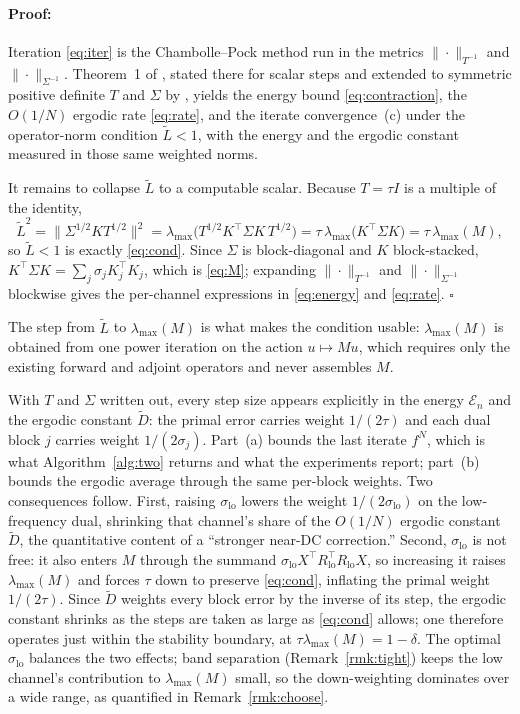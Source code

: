 \documentclass{article}
\newenvironment{proof}{\paragraph{Proof:}}{\hfill$\square$}
\begin{document}
\begin{proof}
Iteration \eqref{eq:iter} is the Chambolle--Pock method run in the metrics $\|\cdot\|_{T^{-1}}$ and $\|\cdot\|_{\Sigma^{-1}}$. Theorem~1 of \citet{chambolle2011first}, stated there for scalar steps and extended to symmetric positive definite $T$ and $\Sigma$ by \citet[\S3]{pock2011diagonal}, yields the energy bound \eqref{eq:contraction}, the $O(1/N)$ ergodic rate \eqref{eq:rate}, and the iterate convergence~(c) under the operator-norm condition $\widetilde L<1$, with the energy and the ergodic constant measured in those same weighted norms.

It remains to collapse $\widetilde L$ to a computable scalar. Because $T=\tau I$ is a multiple of the identity,
\[
\widetilde L^2
=\big\|\Sigma^{1/2}KT^{1/2}\big\|^2
=\lambda_{\max}\!\big(T^{1/2}K^\top\Sigma K\,T^{1/2}\big)
=\tau\,\lambda_{\max}\!\big(K^\top\Sigma K\big)
=\tau\,\lambda_{\max}(M),
\]
so $\widetilde L<1$ is exactly \eqref{eq:cond}. Since $\Sigma$ is block-diagonal and $K$ block-stacked, $K^\top\Sigma K=\sum_j\sigma_jK_j^\top K_j$, which is \eqref{eq:M}; expanding $\|\cdot\|_{T^{-1}}$ and $\|\cdot\|_{\Sigma^{-1}}$ blockwise gives the per-channel expressions in \eqref{eq:energy} and \eqref{eq:rate}.
\end{proof}

The step from $\widetilde L$ to $\lambda_{\max}(M)$ is what makes the condition usable: $\lambda_{\max}(M)$ is obtained from one power iteration on the action $u\mapsto Mu$, which requires only the existing forward and adjoint operators and never assembles $M$.

With $T$ and $\Sigma$ written out, every step size appears explicitly in the energy $\mathcal E_n$ and the ergodic constant $\widetilde D$: the primal error carries weight $1/(2\tau)$ and each dual block $j$ carries weight $1/(2\sigma_j)$. Part~(a) bounds the last iterate $f^N$, which is what Algorithm~\ref{alg:two} returns and what the experiments report; part~(b) bounds the ergodic average through the same per-block weights. Two consequences follow. First, raising $\sigma_{\mathrm{lo}}$ lowers the weight $1/(2\sigma_{\mathrm{lo}})$ on the low-frequency dual, shrinking that channel's share of the $O(1/N)$ ergodic constant $\widetilde D$, the quantitative content of a ``stronger near-DC correction.'' Second, $\sigma_{\mathrm{lo}}$ is not free: it also enters $M$ through the summand $\sigma_{\mathrm{lo}}X^\top R_{\mathrm{lo}}^\top R_{\mathrm{lo}}X$, so increasing it raises $\lambda_{\max}(M)$ and forces $\tau$ down to preserve \eqref{eq:cond}, inflating the primal weight $1/(2\tau)$. Since $\widetilde D$ weights every block error by the inverse of its step, the ergodic constant shrinks as the steps are taken as large as \eqref{eq:cond} allows; one therefore operates just within the stability boundary, at $\tau\lambda_{\max}(M)=1-\delta$. The optimal $\sigma_{\mathrm{lo}}$ balances the two effects; band separation (Remark~\ref{rmk:tight}) keeps the low channel's contribution to $\lambda_{\max}(M)$ small, so the down-weighting dominates over a wide range, as quantified in Remark~\ref{rmk:choose}.
\end{document}
